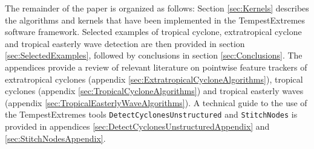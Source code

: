 \documentclass[gmdd, hvmath]{copernicus}
\begin{document}
The remainder of the paper is organized as follows:  Section \ref{sec:Kernels} describes the algorithms and kernels that have been implemented in the TempestExtremes software framework.  Selected examples of tropical cyclone, extratropical cyclone and tropical easterly wave detection are then provided in section \ref{sec:SelectedExamples}, followed by conclusions in section \ref{sec:Conclusions}.  The appendices provide a review of relevant literature on pointwise feature trackers of extratropical cyclones (appendix \ref{sec:ExtratropicalCycloneAlgorithms}), tropical cyclones (appendix \ref{sec:TropicalCycloneAlgorithms}) and tropical easterly waves (appendix \ref{sec:TropicalEasterlyWaveAlgorithms}).  A technical guide to the use of the TempestExtremes tools \texttt{DetectCyclonesUnstructured} and \texttt{StitchNodes} is provided in appendices \ref{sec:DetectCyclonesUnstructuredAppendix} and \ref{sec:StitchNodesAppendix}.





\end{document}
